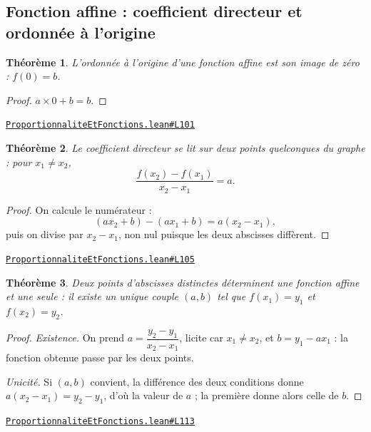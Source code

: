 \documentclass[11pt,a4paper]{article}
\theoremstyle{definition}
\theoremstyle{plain}
\newtheorem{theoreme}{Théorème}
\newcommand{\source}[2]{\par\smallskip\noindent\hfill{\footnotesize\href{#1}{\texttt{#2}}}\par\smallskip}
\begin{document}
\subsection{Fonction affine : coefficient directeur et ordonnée à l'origine}

\begin{theoreme}
L'ordonnée à l'origine d'une fonction affine est son image de zéro : $f(0) = b$.
\end{theoreme}

\begin{proof}
$a \times 0 + b = b$.
\end{proof}
\source{https://github.com/Commutator-IO/learn-lean/blob/main/cours/01-college/05-proportionnalite-et-fonctions/ProportionnaliteEtFonctions.lean\#L101}{ProportionnaliteEtFonctions.lean\#L101}

\begin{theoreme}
Le coefficient directeur se lit sur deux points quelconques du graphe : pour
$x_1 \ne x_2$,
\[ \frac{f(x_2) - f(x_1)}{x_2 - x_1} = a . \]
\end{theoreme}

\begin{proof}
On calcule le numérateur :
\[ (ax_2 + b) - (ax_1 + b) = a(x_2 - x_1) , \]
puis on divise par $x_2 - x_1$, non nul puisque les deux abscisses diffèrent.
\end{proof}
\source{https://github.com/Commutator-IO/learn-lean/blob/main/cours/01-college/05-proportionnalite-et-fonctions/ProportionnaliteEtFonctions.lean\#L105}{ProportionnaliteEtFonctions.lean\#L105}

\begin{theoreme}
Deux points d'abscisses distinctes déterminent une fonction affine et une seule : il
existe un unique couple $(a, b)$ tel que $f(x_1) = y_1$ et $f(x_2) = y_2$.
\end{theoreme}

\begin{proof}
\emph{Existence.} On prend $a = \dfrac{y_2 - y_1}{x_2 - x_1}$, licite car
$x_1 \ne x_2$, et $b = y_1 - a x_1$ : la fonction obtenue passe par les deux points.

\emph{Unicité.} Si $(a, b)$ convient, la différence des deux conditions donne
$a(x_2 - x_1) = y_2 - y_1$, d'où la valeur de $a$ ; la première donne alors celle de
$b$.
\end{proof}
\source{https://github.com/Commutator-IO/learn-lean/blob/main/cours/01-college/05-proportionnalite-et-fonctions/ProportionnaliteEtFonctions.lean\#L113}{ProportionnaliteEtFonctions.lean\#L113}
\end{document}
